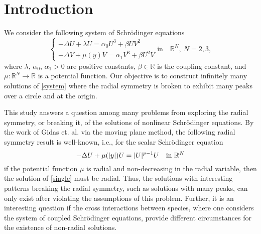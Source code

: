 \documentclass{amsart}
\theoremstyle{definition}
\theoremstyle{remark}
\numberwithin{equation}{section}
\begin{document}


\section{Introduction} \label{sec:intro}
 


We consider the following system of Schr\"odinger equations
\begin{equation}\left.\begin{cases}\label{system}
 -\Delta U + \lambda U = \alpha_0 U^3+ \beta UV^2\\
 -\Delta V + \mu(y) V = \alpha_1 V^3+\beta U^2V 
\end{cases}\right. \text{in} \quad \mathbb{R}^N, \ N=2,  3,\end{equation}
where  $\lambda$, $\alpha_0$, $\alpha_1>0$ are positive constants,    $\beta \in \mathbb{R}$ is the  coupling constant, and $\mu: \mathbb{R}^N \rightarrow \mathbb{R}$ is a potential function.  Our objective is to construct infinitely many solutions of \eqref{system} where the radial symmetry is broken to exhibit many peaks over a circle and at the origin.

This study answers a question among many problems from exploring the radial symmetry, or breaking it, of the solutions of nonlinear Schr\"odinger equations. By the work of  Gidas et. al. \cite{GNN} via the moving plane method, the following radial symmetry result is well-known, i.e., for the scalar Schr\"odinger equation
\begin{equation} \label{single}
 -\Delta U+ \mu(|y|) U = |U|^{p-1}U \quad \text{in $ \mathbb{R}^N$} %
\end{equation}
if the potential function $\mu$ is radial and non-decreasing in the radial variable, then the solution of \eqref{single} must be radial. Thus, the solutions with interesting patterns breaking the radial symmetry, such as solutions with many peaks, can only exist after violating the assumptions of this problem. Further, it is an interesting question if the cross interactions between species, where one considers the system of coupled Schr\"odinger equations, provide different circumstances for the existence of non-radial solutions.
\end{document}
